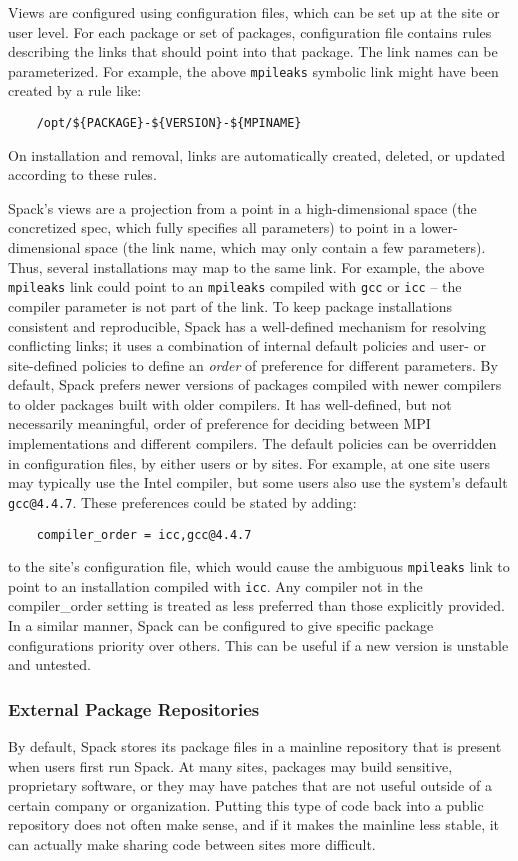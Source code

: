 Views are configured using configuration files, which can be set up at the site or
user level.
For each package or set of packages, configuration file contains rules
describing the links that should point into that package.
The link names can be parameterized.
For example, the above {\tt mpileaks} symbolic link might have been created by a rule like:
%
\begin{verbatim}
    /opt/${PACKAGE}-${VERSION}-${MPINAME}
\end{verbatim}
%
On installation and removal,
links are automatically created, deleted, or updated according to these rules.

Spack's views are a projection from a point in a high-dimensional space
(the concretized spec, which fully specifies all parameters) to point
in a lower-dimensional space
(the link name, which may only contain a few parameters).
Thus, several installations may map to the same link.
For example, the above {\tt mpileaks} link could point to an {\tt mpileaks} compiled with
{\tt gcc} or {\tt icc} -- the compiler parameter is not part of the link.
To keep  package installations consistent and reproducible,
Spack has a well-defined mechanism for resolving conflicting links;
it uses a combination of internal default policies and user- or site-defined
policies to define an {\it order} of preference for different parameters.
By default, Spack prefers newer versions of packages compiled with newer compilers
to older packages built with older compilers. It has well-defined, but not
necessarily meaningful, order of preference for deciding between MPI
implementations and different compilers.
The default policies can be overridden in configuration files, by either users
or by sites. For example, at one site users may typically use the Intel compiler,
but some users also use the system's default {\tt gcc@4.4.7}.
These preferences could be stated by adding:
%
\begin{verbatim}
    compiler_order = icc,gcc@4.4.7
\end{verbatim}
%
to the site's configuration file, which would cause the ambiguous
{\tt mpileaks} link to point to an installation compiled with {\tt icc}.
Any compiler not in the compiler\_order setting is treated as less preferred
than those explicitly provided.
%
In a similar manner, Spack can be configured to give specific package
configurations priority over others.
This can be useful if a new version is unstable and untested.

\subsubsection{External Package Repositories}
By default, Spack stores its package files in a mainline repository
that is present when users
first run Spack.  At many sites, packages may build sensitive,
proprietary software, or they
may have patches that are not useful outside of a certain company or
organization.  Putting this type of code back into a public repository
does not often make sense, and if it makes the
mainline less stable, it can actually make sharing code between sites more difficult.

